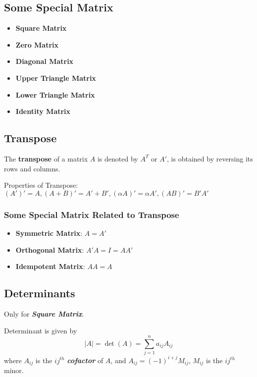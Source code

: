 \subsection{Some Special Matrix}
\begin{itemize}
    \item \textbf{Square Matrix}
    \item \textbf{Zero Matrix}
    \item \textbf{Diagonal Matrix}
    \item \textbf{Upper Triangle Matrix}
    \item \textbf{Lower Triangle Matrix}
    \item \textbf{Identity Matrix}
\end{itemize}

\subsection{Transpose}

\begin{definition}[Transpose]
    The \textbf{transpose} of a matrix $A$ is denoted by $A^T$ or $A'$, is obtained by reversing its rows and columns.
\end{definition}
Properties of Transpose: $(A')' = A, (A+B)' = A' + B', (\alpha A)'=\alpha A', (AB)'=B'A'$

\subsubsection{Some Special Matrix Related to Transpose}
\begin{itemize}
    \item \textbf{Symmetric Matrix}: $A=A'$
    \item \textbf{Orthogonal Matrix}: $A'A=I=AA'$
    \item \textbf{Idempotent Matrix}: $AA=A$
\end{itemize}

\subsection{Determinants}
\begin{remark*}
    Only for \textbf{\textit{Square Matrix}}.
\end{remark*}
\begin{definition}
    Determinant is given by
    \begin{equation*}
        |A|=\det(A)=\sum_{j=1}^{n} a_{ij}A_{ij}
    \end{equation*}
    where $A_{ij}$ is the $ij ^{th}$ \textit{\textbf{cofactor}} of $A$, and $A_{ij} = (-1)^{i+j}M_{ij}$, $M_{ij}$ is the $ij ^{th}$ minor.
\end{definition}



